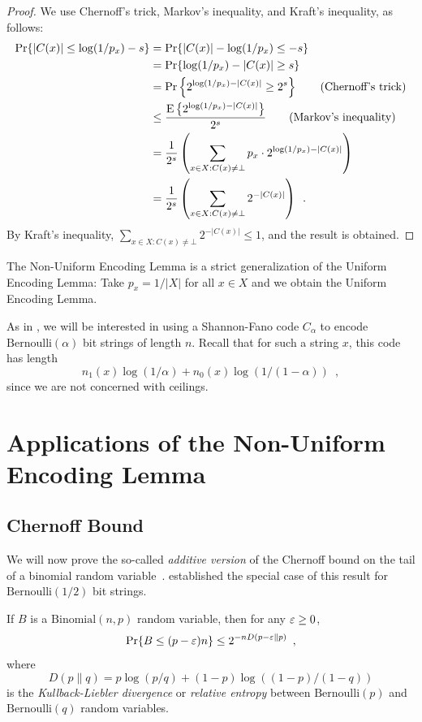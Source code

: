 \documentclass{patmorin}
\begin{document}
\begin{proof}
  We use Chernoff's trick, Markov's inequality, and Kraft's
  inequality, as follows:
  \begin{align*}
    \Pr\{ |C(x)| \le\log(1/p_x)-s \}
    & = \Pr\{|C(x)| -\log(1/p_x) \le -s \} \\
    & = \Pr\{\log(1/p_x)-|C(x)| \ge s \} \\
    & = \Pr\left\{2^{\log(1/p_x)-|C(x)|} \ge 2^s \right\}  \tag{Chernoff's trick} \\
    & \le \frac{\operatorname{\mathrm{E}}\left\{2^{\log(1/p_x)-|C(x)|}\right\}}{2^s} \tag{Markov's inequality} \\
    & = \frac{1}{2^s} \left(\sum_{x\in X : C(x) \neq \bot} p_x\cdot 2^{\log(1/p_x)-|C(x)|}\right) \\
    & = \frac{1}{2^s} \left(\sum_{x\in X : C(x) \neq \bot }2^{-|C(x)|}\right) \enspace .
  \end{align*}
  By Kraft's inequality,
  $\sum_{x \in X : C(x) \neq \bot} 2^{-|C(x)|} \leq 1$, and the result
  is obtained.
\end{proof}

The Non-Uniform Encoding Lemma is a strict generalization
of the Uniform Encoding Lemma: Take $p_x=1/|X|$ for all $x\in X$ and
we obtain the Uniform Encoding Lemma.

As in , we will be interested in using a
Shannon-Fano code $C_\alpha$ to encode $\mathrm{Bernoulli}(\alpha)$
bit strings of length $n$. Recall that for such a string $x$, this
code has length
\[
  n_1(x) \log (1/\alpha) + n_0(x) \log(1/(1 - \alpha)) \enspace ,
\]
since we are not concerned with ceilings.

\section{Applications of the Non-Uniform Encoding Lemma}

\subsection{Chernoff Bound}

We will now prove the so-called \emph{additive version} of the
Chernoff bound on the tail of a binomial random
variable~\cite{chernoff:bound}.  established
the special case of this result for $\mathrm{Bernoulli}(1/2)$ bit
strings.

\begin{thm}
  If $B$ is a $\mathrm{Binomial}(n,p)$ random variable, then for any
  $\varepsilon \geq 0$,
  \[
    \Pr\{B\le(p-\varepsilon)n\} \le 2^{-nD(p-\varepsilon \| p)} \enspace ,
  \]
  where 
  \[ 
    D(p \| q)= p\log (p/q) + (1-p)\log ((1 - p)/(1 - q))
  \]
  is the \emph{Kullback-Liebler divergence} or \emph{relative entropy}
  between $\mathrm{Bernoulli}(p)$ and $\mathrm{Bernoulli}(q)$ random
  variables.
\end{thm}
\end{document}
